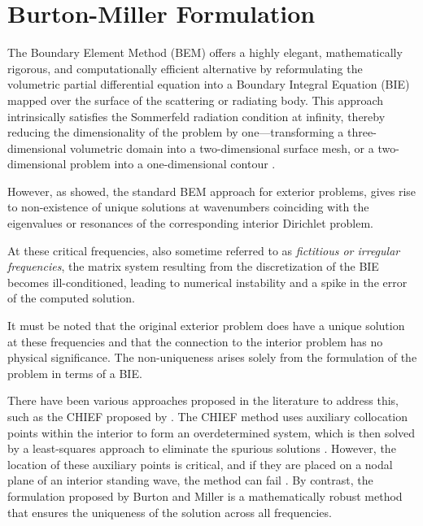 \section{Burton-Miller Formulation}\label{sec:burton-miller}

The Boundary Element Method (BEM) offers a highly elegant, mathematically rigorous, and computationally efficient alternative by reformulating the volumetric partial differential equation into a Boundary Integral Equation (BIE) mapped over the surface of the scattering or radiating body. This approach intrinsically satisfies the Sommerfeld radiation condition at infinity, thereby reducing the dimensionality of the problem by one—transforming a three-dimensional volumetric domain into a two-dimensional surface mesh, or a two-dimensional problem into a one-dimensional contour \cite{kirkupboundaryelementmethod1998}.

However, as \cite{burtonapplicationintegralequation1971} showed, the standard \ac{BEM} approach for exterior problems, gives rise to non-existence of unique solutions at wavenumbers coinciding with the eigenvalues or resonances of the corresponding interior Dirichlet problem.

At these critical frequencies, also sometime referred to as \textit{fictitious or irregular frequencies}, the matrix system resulting from the discretization of the BIE  becomes ill-conditioned, leading to numerical instability and a spike in the error of the computed solution. 

It must be noted that the original exterior problem does have a unique solution at these frequencies and that the connection to the interior problem has no physical significance. The non-uniqueness arises solely from the formulation of the problem in terms of a \ac{BIE}.\cite{burtonapplicationintegralequation1971}

There have been various approaches proposed in the literature to address this, such as the \ac{CHIEF} proposed by \cite{schenckimprovedintegralformulation1968}. 
The \ac{CHIEF} method uses auxiliary collocation points within the interior to form an overdetermined system, which is then solved by a least-squares approach to eliminate the spurious solutions \cite{chieneffectivemethodsolving1990}. 
However, the location of these auxiliary points is critical, and if they are placed on a nodal plane of an interior standing wave, the method can fail \cite{langrennesolvinghypersingularboundary2015}.
By contrast, the formulation proposed by  Burton and Miller \cite{burtonapplicationintegralequation1971} is a mathematically robust method that ensures the uniqueness of the solution across all frequencies. 


